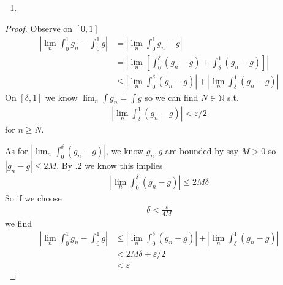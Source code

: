 \begin{enumerate}[label=(\alph*)]
    \item 

\end{enumerate}


\begin{proof}
    Observe on $[0,1]$
    \begin{align*}
        |\lim_n \int_0^1 g_n - \int_0^1 g| &= |\lim_n \int_0^1 g_n-g| \\
        &= |\lim_n [\int_0^\delta (g_n-g) + \int_\delta^1 (g_n-g)]| \\
        &\leq |\lim_n \int_0^\delta (g_n-g) | + |\lim_n \int_\delta^1 (g_n-g)|
    \end{align*}
    On $[\delta, 1]$ we know $\lim_n \int g_n = \int g$ so we can find
    $N \in \mathbb{N}$ s.t. 
    \begin{align*}
        |\lim_n \int_\delta^1 (g_n-g)| < \varepsilon/2
    \end{align*}
    for $n\geq N$.

    As for $|\lim_n \int_0^\delta (g_n-g) |$, we know $g_n, g$ are 
    bounded by say $M>0$ so $|g_n-g|\leq 2M$.
    By .2 we know this implies  
    \begin{align*}
        |\lim_n \int_0^\delta (g_n-g) | \leq 2M\delta
    \end{align*}
    So if we choose
    \begin{align*}
        \delta < \frac{\varepsilon}{4M}
    \end{align*}
    we find 
    \begin{align*}
        |\lim_n \int_0^1 g_n - \int_0^1 g| &\leq  |\lim_n \int_0^\delta (g_n-g) | + |\lim_n \int_\delta^1 (g_n-g)| \\
        &<  2M\delta  + \varepsilon/2 \\
        &<  \varepsilon
    \end{align*}
\end{proof}